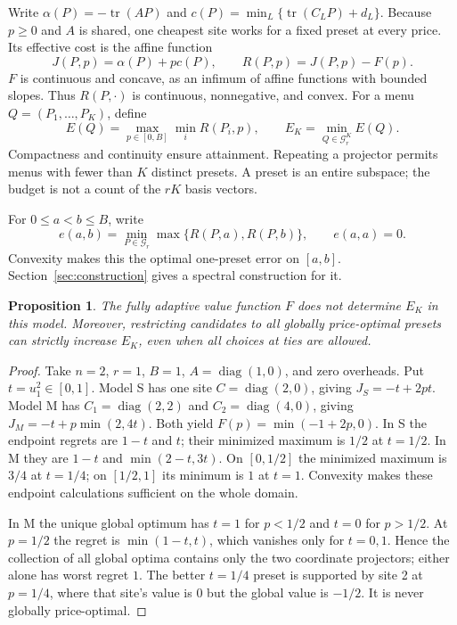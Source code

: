 \documentclass[11pt]{article}
\newtheorem{proposition}[theorem]{Proposition}
\newcommand{\tr}{\operatorname{tr}}
\newcommand{\diag}{\operatorname{diag}}
\newcommand{\Gr}{\mathcal G_r}
\begin{document}
Write $\alpha(P)=-\tr(AP)$ and $c(P)=\min_L\{\tr(C_LP)+d_L\}$.
Because $p\ge0$ and $A$ is shared, one cheapest site works for a fixed
preset at every price. Its effective cost is the affine function
\begin{equation}
 J(P,p)=\alpha(P)+pc(P),\qquad R(P,p)=J(P,p)-F(p).             \label{eq:regret}
\end{equation}
$F$ is continuous and concave, as an infimum of affine functions with
bounded slopes. Thus $R(P,\cdot)$ is continuous, nonnegative, and convex.
For a menu $Q=(P_1,\ldots,P_K)$, define
\begin{equation}
 E(Q)=\max_{p\in[0,B]}\min_i R(P_i,p),\qquad
 E_K=\min_{Q\in\Gr^K}E(Q).                                  \label{eq:menu}
\end{equation}
Compactness and continuity ensure attainment. Repeating a projector permits
menus with fewer than $K$ distinct presets. A preset is an entire subspace;
the budget is not a count of the $rK$ basis vectors.

For $0\le a<b\le B$, write
\[
 e(a,b)=\min_{P\in\Gr}\max\{R(P,a),R(P,b)\},\qquad e(a,a)=0.
\]
Convexity makes this the optimal one-preset error on $[a,b]$.
Section~\ref{sec:construction} gives a spectral construction for it.

\begin{proposition}\label{prop:separation}
The fully adaptive value function $F$ does not determine $E_K$ in this
model. Moreover, restricting candidates to all globally price-optimal
presets can strictly increase $E_K$, even when all choices at ties are allowed.
\end{proposition}
\begin{proof}
Take $n=2$, $r=1$, $B=1$, $A=\diag(1,0)$, and zero overheads. Put
$t=u_1^2\in[0,1]$. Model S has one site $C=\diag(2,0)$, giving
$J_S=-t+2pt$. Model M has $C_1=\diag(2,2)$ and $C_2=\diag(4,0)$,
giving $J_M=-t+p\min(2,4t)$. Both yield
$F(p)=\min(-1+2p,0)$. In S the endpoint regrets are $1-t$ and $t$;
their minimized maximum is $1/2$ at $t=1/2$. In M they are
$1-t$ and $\min(2-t,3t)$. On $[0,1/2]$ the minimized maximum is
$3/4$ at $t=1/4$; on $[1/2,1]$ its minimum is $1$ at $t=1$.
Convexity makes these endpoint calculations sufficient on the whole domain.

In M the unique global optimum has $t=1$ for $p<1/2$ and $t=0$ for
$p>1/2$. At $p=1/2$ the regret is $\min(1-t,t)$, which vanishes only
for $t=0,1$. Hence the collection of all global optima contains only the
two coordinate projectors; either alone has worst regret $1$. The better
$t=1/4$ preset is supported by site 2 at $p=1/4$, where that site's value
is $0$ but the global value is $-1/2$. It is never globally price-optimal.
\end{proof}
\end{document}
